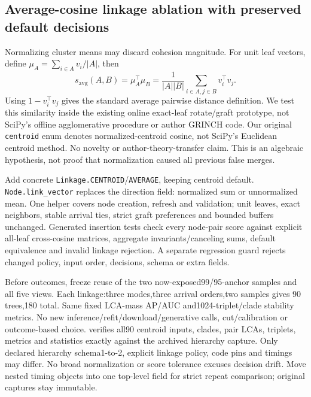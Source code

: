 \documentclass[11pt]{article}
\begin{document}
\subsection{Average-cosine linkage ablation with preserved default decisions}
Normalizing cluster means may discard cohesion magnitude. For unit leaf vectors,
define \(\mu_A=\sum_{i\in A}v_i/|A|\), then
\[
 s_{\mathrm{avg}}(A,B)=\mu_A^\top\mu_B
 =\frac{1}{|A||B|}\sum_{i\in A,j\in B}v_i^\top v_j.
\]
Using \(1-v_i^\top v_j\) gives the standard average pairwise distance
definition\cite{averagelinkage}. We test this similarity inside the existing
online exact-leaf rotate/graft prototype\cite{grinch}, not SciPy's offline
agglomerative procedure or author GRINCH code. Our original \texttt{centroid}
enum denotes normalized-centroid cosine, not SciPy's Euclidean centroid method.
No novelty or author-theory-transfer claim. This is an algebraic hypothesis,
not proof that normalization caused all previous false merges.

Add concrete \texttt{Linkage.CENTROID}/\texttt{AVERAGE}, keeping centroid default.
\texttt{Node.link\_vector} replaces the direction field: normalized sum or
unnormalized mean. One helper covers node creation, refresh and validation;
unit leaves, exact neighbors, stable arrival ties, strict graft preferences and
bounded buffers unchanged. Generated insertion tests check every node-pair score
against explicit all-leaf cross-cosine matrices, aggregate invariants/canceling
sums, default equivalence and invalid linkage rejection. A separate regression
guard rejects changed policy, input order, decisions, schema or extra fields.

Before outcomes, freeze reuse of the two now-exposed99/95-anchor samples and
all five views. Each linkage:three modes,three arrival orders,two samples gives
90 trees,180 total. Same fixed LCA-mass AP/AUC and1024-triplet/clade stability
metrics. No new inference/refit/download/generative calls, cut/calibration or
outcome-based choice.  verifies all90
centroid inputs, clades, pair LCAs, triplets, metrics and statistics exactly
against the archived hierarchy capture. Only declared hierarchy schema1-to-2,
explicit linkage policy, code pins and timings may differ. No broad normalization
or score tolerance excuses decision drift. Move nested timing objects into one
top-level field for strict repeat comparison; original captures stay immutable.
\end{document}
